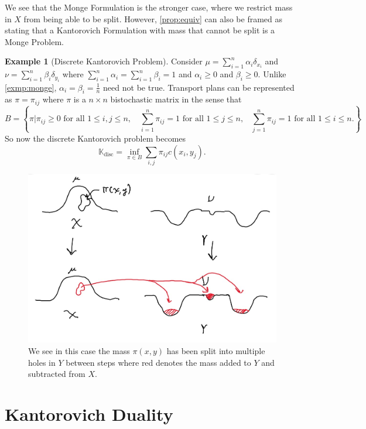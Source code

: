 \documentclass[psamsfonts]{amsart}
\theoremstyle{definition}
\newtheorem{exmp}{Example}[section]
\numberwithin{equation}{section}
\begin{document}
We see that the Monge Formulation is the stronger case, where we restrict mass in $X$ from being able to be split. However, \autoref{prop:equiv} can also be framed as stating that a Kantorovich Formulation with mass
that cannot be split is a Monge Problem.
\begin{exmp}[Discrete Kantorovich Problem]
  Consider $\mu = \sum_{i=1}^n\alpha_i\delta_{x_i}$ and $\nu = \sum_{i=1}^n\beta_{i}\delta_{y_i}$ where $\sum_{i=1}^n \alpha_i = \sum_{i=1}^n\beta_i = 1$ and $\alpha_i \ge 0$ and $\beta_i \ge 0$. Unlike \autoref{exmp:monge}, $\alpha_i = \beta_i = \frac{1}{n}$ need not be true. Transport plans can be represented as $\pi = \pi_{ij}$\cite{thorpe} where $\pi$ is a $n\times n$ bistochastic matrix in the sense that
  \[B = \left\{\pi \bigg\vert\pi_{ij} \ge 0 \text{ for all $1 \le i,j\le n$}, \quad \sum_{i=1}^n\pi_{ij} = 1 \text{ for all $1\le j\le n$,}\quad \sum_{j=1}^n\pi_{ij} = 1 \text{ for all $1\le i\le n$.}\right\}\]
  So now the discrete Kantorovich problem becomes 
  \begin{equation}
    \mathbb{K}_{\text{disc}} = \inf_{\pi\in B}\sum_{i,j}\pi_{ij}c(x_i,y_j).
  \end{equation}
  \begin{figure}[H]
    \includegraphics[scale=0.3]{kantorovich.jpg}
    \caption{We see in this case the mass $\pi(x,y)$ has been split into multiple holes in $Y$ between steps where red denotes the mass added to $Y$ and subtracted from $X$.}
    \label{fig:kant}
  \end{figure}
\end{exmp} 
\section{Kantorovich Duality}
\end{document}
